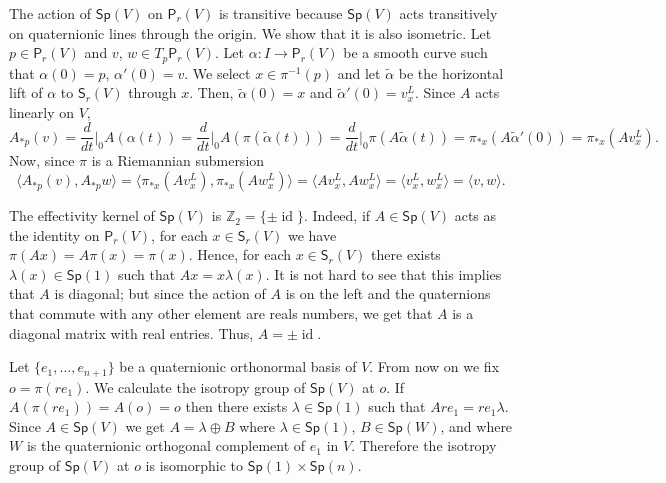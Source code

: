 \documentclass[12pt, a4paper]{amsart}
\newcommand{\id}{\operatorname{id}}
\newcommand{\Sp}{\mathsf{Sp}}
\theoremstyle{remark}
\begin{document}
The action of $\Sp(V)$ on $\mathsf{P}_r(V)$ is transitive because $\Sp(V)$ acts transitively on quaternionic lines through the origin.
We show that it is also isometric.
Let $p\in\mathsf{P}_r(V)$ and $v$, $w\in T_p\mathsf{P}_r(V)$.
Let $\alpha\colon I\to\mathsf{P}_r(V)$ be a smooth curve such that $\alpha(0)=p$, $\alpha'(0)=v$.
We select $x\in\pi^{-1}(p)$ and let $\tilde{\alpha}$ be the horizontal lift of $\alpha$ to $\mathsf{S}_r(V)$ through $x$.
Then, $\tilde{\alpha}(0)=x$ and $\tilde{\alpha}'(0)=v_x^L$.
Since $A$ acts linearly on $V$,
\[
A_{*p}(v)
=\frac{d}{dt}\Big\vert_0 A(\alpha(t))
=\frac{d}{dt}\Big\vert_0 A(\pi(\tilde{\alpha}(t)))
=\frac{d}{dt}\Big\vert_0 \pi(A\tilde{\alpha}(t))
=\pi_{*x}(A\tilde{\alpha}'(0))
=\pi_{*x}(Av_x^L).
\]
Now, since $\pi$ is a Riemannian submersion
\[
\langle A_{*p}(v),A_{*p}w\rangle
=\langle \pi_{*x}(A v_x^L),\pi_{*x}(A w_x^L)\rangle
=\langle A v_x^L,A w_x^L\rangle
=\langle v_x^L,w_x^L\rangle
=\langle v,w\rangle.
\]

The effectivity kernel of $\Sp(V)$ is $\mathbb{Z}_2=\{\pm \id\}$.
Indeed, if $A\in\Sp(V)$ acts as the identity on $\mathsf{P}_r(V)$, for each $x\in\mathsf{S}_r(V)$ we have 
$\pi(Ax)=A\pi(x)=\pi(x)$.
Hence, for each $x\in\mathsf{S}_r(V)$ there exists $\lambda(x)\in\Sp(1)$ such that $Ax=x\lambda(x)$.
It is not hard to see that this implies that $A$ is diagonal;
but since the action of $A$ is on the left and the quaternions that commute with any other element are reals numbers, we get that $A$ is a diagonal matrix with real entries.
Thus, $A=\pm\id$.

Let $\{e_1,\dots,e_{n+1}\}$ be a quaternionic orthonormal basis of $V$.
From now on we fix $o=\pi(r e_1)$.
We calculate the isotropy group of $\Sp(V)$ at $o$.
If $A(\pi(r e_1))=A(o)=o$ then there exists $\lambda\in\Sp(1)$ such that $Are_1=re_1\lambda$.
Since $A\in\Sp(V)$ we get $A=\lambda\oplus B$ where $\lambda\in\Sp(1)$, $B\in\Sp(W)$, and where $W$ is the quaternionic orthogonal complement of $e_1$ in $V$.
Therefore the isotropy group of $\Sp(V)$ at $o$ is isomorphic to $\Sp(1)\times\Sp(n)$.
\end{document}
